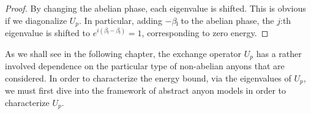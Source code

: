 \begin{proof}
  By changing the abelian phase, each eigenvalue is shifted. This is obvious if we diagonalize $U_p$. In particular, adding $-βⱼ$ to the abelian phase, the $j$:th eigenvalue is shifted to $e^{i(βⱼ-βⱼ)} = 1$, corresponding to zero energy.
\end{proof}


As we shall see in the following chapter, the exchange operator $U_p$ has a rather involved dependence on the particular type of non-abelian anyons that are considered. In order to characterize the energy bound, via the eigenvalues of $U_p$, we must first dive into the framework of abstract anyon models in order to characterize $U_p$.
